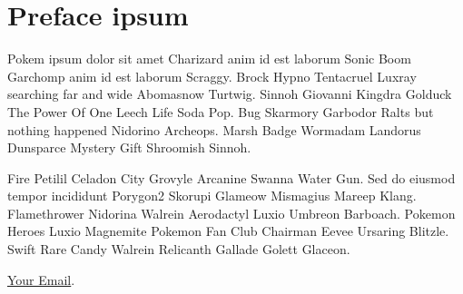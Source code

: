 \section*{Preface ipsum}

Pokem ipsum dolor sit amet Charizard anim id est laborum Sonic Boom Garchomp anim id est laborum Scraggy. Brock Hypno Tentacruel Luxray searching far and wide Abomasnow Turtwig. Sinnoh Giovanni Kingdra Golduck The Power Of One Leech Life Soda Pop. Bug Skarmory Garbodor Ralts but nothing happened Nidorino Archeops. Marsh Badge Wormadam Landorus Dunsparce Mystery Gift Shroomish Sinnoh.

Fire Petilil Celadon City Grovyle Arcanine Swanna Water Gun. Sed do eiusmod tempor incididunt Porygon2 Skorupi Glameow Mismagius Mareep Klang. Flamethrower Nidorina Walrein Aerodactyl Luxio Umbreon Barboach. Pokemon Heroes Luxio Magnemite Pokemon Fan Club Chairman Eevee Ursaring Blitzle. Swift Rare Candy Walrein Relicanth Gallade Golett Glaceon. 

\href{mailto:email@gmail.com}{Your Email}.


